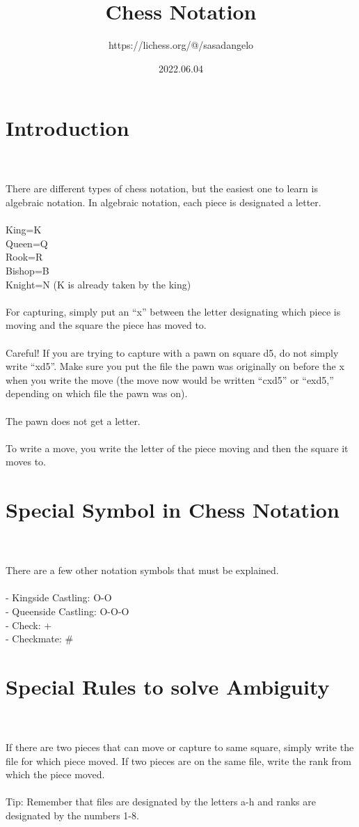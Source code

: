 \documentclass{article}
\title{Chess Notation}
\author{https://lichess.org/@/sasadangelo}
\date{2022.06.04}
\begin{document}
\begin{titlepage}
\maketitle
\end{titlepage}
\section{ Introduction}

\\
\\
There are different types of chess notation, but the easiest one to learn is algebraic notation. In algebraic notation, each piece is designated a letter.\\\\King=K\\Queen=Q\\Rook=R\\Bishop=B\\Knight=N (K is already taken by the king)\\\\For capturing, simply put an “x” between the letter designating which piece is moving and the square the piece has moved to.\\\\Careful! If you are trying to capture with a pawn on square d5, do not simply write “xd5”. Make sure you put the file the pawn was originally on before the x when you write the move (the move now would be written “cxd5” or “exd5,” depending on which file the pawn was on).\\\\The pawn does not get a letter.\\\\To write a move, you write the letter of the piece moving and then the square it moves to.\section{ Special Symbol in Chess Notation}

\\
\\
There are a few other notation symbols that must be explained.\\\\- Kingside Castling: O-O\\- Queenside Castling: O-O-O\\- Check: +\\- Checkmate: \#\section{ Special Rules to solve Ambiguity}

\\
\\
If there are two pieces that can move or capture to same square, simply write the file for which piece moved. If two pieces are on the same file, write the rank from which the piece moved.\\\\Tip: Remember that files are designated by the letters a-h and ranks are designated by the numbers 1-8.
\end{document}
